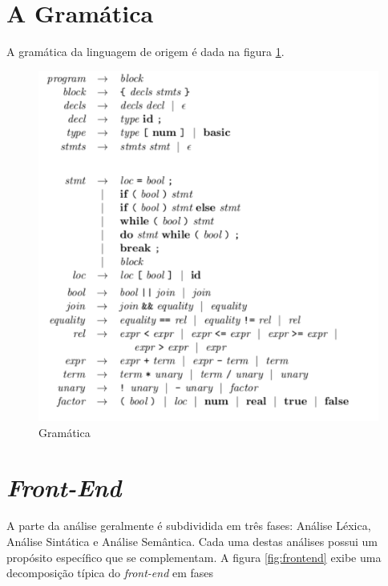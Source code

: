 \documentclass[12pt]{article}
\begin{document}
\section{A Gramática}
\label{sec:gram}

A gramática da linguagem de origem é dada na figura \ref{fig:gram}.

\begin{figure}[h!]
\centering
\begin{minipage}[b]{0.77\linewidth}
\includegraphics[width=\linewidth]{gram}
\end{minipage}
\caption{Gramática}
\label{fig:gram}
\end{figure}

\section{\textit{Front-End}}
\label{sec:frontend}

A parte da análise geralmente é subdividida em três fases: Análise Léxica, Análise Sintática e Análise Semântica. Cada uma destas análises possui um propósito específico que se complementam. A figura \ref{fig:frontend} exibe uma decomposição típica do \textit{front-end} em fases
\end{document}
